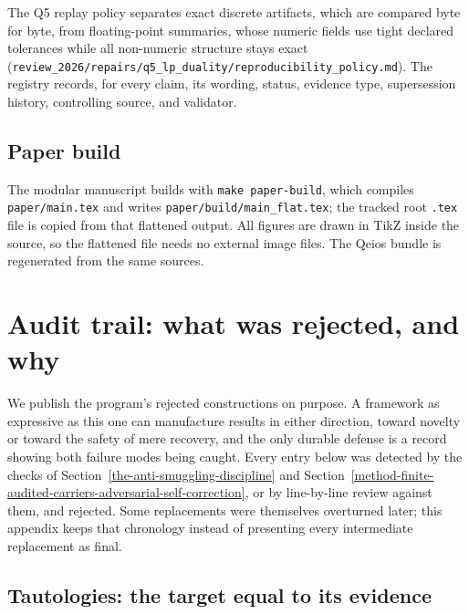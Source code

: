 \documentclass[11pt]{article}
\theoremstyle{definition}
\begin{document}
The Q5 replay policy separates exact discrete artifacts, which are compared byte for byte, from floating-point
summaries, whose numeric fields use tight declared tolerances while all non-numeric structure stays exact
(\nolinkurl{review_2026/repairs/q5_lp_duality/reproducibility_policy.md}). The registry records, for every claim, its
wording, status, evidence type, supersession history, controlling source, and validator.

\subsection{Paper build}

The modular manuscript builds with \texttt{make paper-build}, which compiles \nolinkurl{paper/main.tex} and writes
\nolinkurl{paper/build/main_flat.tex}; the tracked root \texttt{.tex} file is copied from that flattened output. All
figures are drawn in TikZ inside the source, so the flattened file needs no external image files. The Qeios bundle is
regenerated from the same sources.
 \section{Audit trail: what was rejected, and why}\label{adversarial-audit-trail-what-was-rejected-and-why}

We publish the program's rejected constructions on purpose. A framework as expressive as this one can manufacture
results in either direction, toward novelty or toward the safety of mere recovery, and the only durable defense is a
record showing both failure modes being caught. Every entry below was detected by the checks of
Section~\ref{the-anti-smuggling-discipline} and Section~\ref{method-finite-audited-carriers-adversarial-self-correction},
or by line-by-line review against them, and rejected. Some replacements were themselves overturned later; this appendix
keeps that chronology instead of presenting every intermediate replacement as final.

\subsection{Tautologies: the target equal to its evidence}\label{tautologies-the-target-equal-to-its-evidence}
\end{document}
